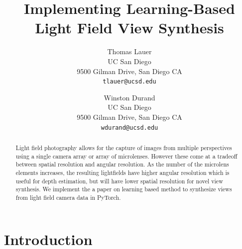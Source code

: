 \documentclass[10pt,twocolumn,letterpaper]{article}
\begin{document}
\title{Implementing Learning-Based Light Field View Synthesis}

\author{Thomas Lauer\\
UC San Diego\\
9500 Gilman Drive, San Diego CA\\
{\tt\small tlauer@ucsd.edu}
\and
Winston Durand\\
UC San Diego\\
9500 Gilman Drive, San Diego CA\\
{\tt\small wdurand@ucsd.edu}
}

\maketitle

\begin{abstract}
Light field photography allows for the capture of images from multiple
perspectives using a single camera array or array of microlenses. However
these come at a tradeoff between spatial resolution and angular resolution.
As the number of the microlens elements increases, the resulting lightfields
have higher angular resolution which is useful for depth estimation,
but will have lower spatial resolution for novel view synthesis.
We implement the a paper on learning based method to synthesize views from light
field camera data \cite{LearningViewSynthesis} in PyTorch.
\end{abstract}


\section{Introduction}
\end{document}
